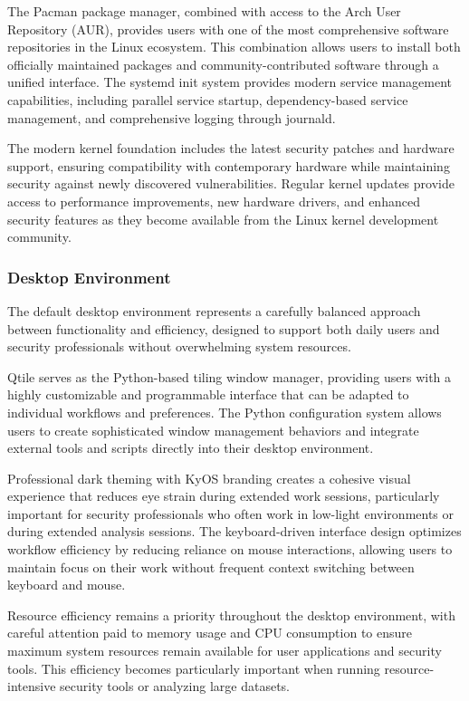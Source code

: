 \documentclass[12pt,a4paper]{article}
\begin{document}
The Pacman package manager, combined with access to the Arch User Repository (AUR), provides users with one of the most comprehensive software repositories in the Linux ecosystem. This combination allows users to install both officially maintained packages and community-contributed software through a unified interface. The systemd init system provides modern service management capabilities, including parallel service startup, dependency-based service management, and comprehensive logging through journald.

The modern kernel foundation includes the latest security patches and hardware support, ensuring compatibility with contemporary hardware while maintaining security against newly discovered vulnerabilities. Regular kernel updates provide access to performance improvements, new hardware drivers, and enhanced security features as they become available from the Linux kernel development community.

\subsubsection{Desktop Environment}
The default desktop environment represents a carefully balanced approach between functionality and efficiency, designed to support both daily users and security professionals without overwhelming system resources.

Qtile serves as the Python-based tiling window manager, providing users with a highly customizable and programmable interface that can be adapted to individual workflows and preferences. The Python configuration system allows users to create sophisticated window management behaviors and integrate external tools and scripts directly into their desktop environment.

Professional dark theming with KyOS branding creates a cohesive visual experience that reduces eye strain during extended work sessions, particularly important for security professionals who often work in low-light environments or during extended analysis sessions. The keyboard-driven interface design optimizes workflow efficiency by reducing reliance on mouse interactions, allowing users to maintain focus on their work without frequent context switching between keyboard and mouse.

Resource efficiency remains a priority throughout the desktop environment, with careful attention paid to memory usage and CPU consumption to ensure maximum system resources remain available for user applications and security tools. This efficiency becomes particularly important when running resource-intensive security tools or analyzing large datasets.
\end{document}
